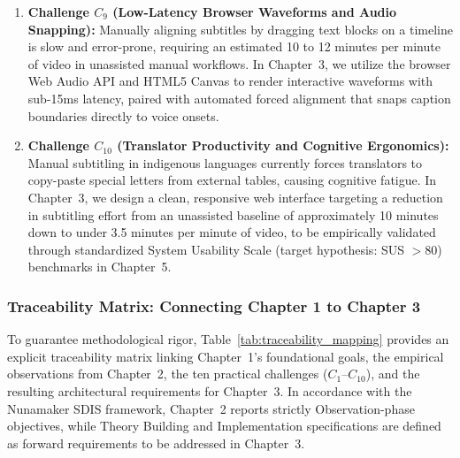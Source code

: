 \documentclass[a4paper,11pt]{article}
\begin{document}
\begin{enumerate}
    \item \textbf{Challenge $C_9$ (Low-Latency Browser Waveforms and Audio Snapping):} Manually aligning subtitles by dragging text blocks on a timeline is slow and error-prone, requiring an estimated 10 to 12 minutes per minute of video in unassisted manual workflows. In Chapter~3, we utilize the browser Web Audio API and HTML5 Canvas to render interactive waveforms with sub-15ms latency, paired with automated forced alignment that snaps caption boundaries directly to voice onsets.

    \item \textbf{Challenge $C_{10}$ (Translator Productivity and Cognitive Ergonomics):} Manual subtitling in indigenous languages currently forces translators to copy-paste special letters from external tables, causing cognitive fatigue. In Chapter~3, we design a clean, responsive web interface targeting a reduction in subtitling effort from an unassisted baseline of approximately 10 minutes down to under 3.5 minutes per minute of video, to be empirically validated through standardized System Usability Scale (target hypothesis: SUS $>80$) benchmarks in Chapter~5.
\end{enumerate}

\subsubsection{Traceability Matrix: Connecting Chapter 1 to Chapter 3}
\label{sec:chap2_traceability}
To guarantee methodological rigor, Table~\ref{tab:traceability_mapping} provides an explicit traceability matrix linking Chapter~1's foundational goals, the empirical observations from Chapter~2, the ten practical challenges ($C_1$--$C_{10}$), and the resulting architectural requirements for Chapter~3. In accordance with the Nunamaker SDIS framework, Chapter~2 reports strictly Observation-phase objectives, while Theory Building and Implementation specifications are defined as forward requirements to be addressed in Chapter~3.
\end{document}
